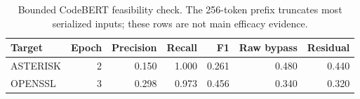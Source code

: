 \begin{table}[t]
\centering
\caption{Bounded CodeBERT feasibility check. The 256-token prefix truncates most serialized inputs; these rows are not main efficacy evidence.}
\label{tab:codebert-results}
\scriptsize
\begin{tabular}{lrrrrrr}
\toprule
Target & Epoch & Precision & Recall & F1 & Raw bypass & Residual \\ 
\midrule
ASTERISK & 2 & 0.150 & 1.000 & 0.261 & 0.480 & 0.440 \\
OPENSSL & 3 & 0.298 & 0.973 & 0.456 & 0.340 & 0.320 \\
\bottomrule
\end{tabular}
\end{table}
